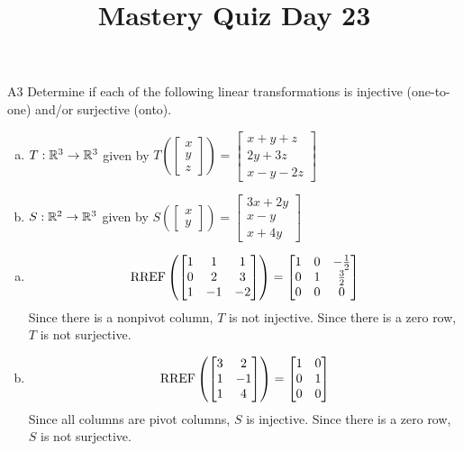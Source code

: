 \documentclass{sbgLAquiz}
\title{Mastery Quiz Day 23 }
\begin{document}
\begin{problem}{A3}
Determine if each of the following linear transformations is injective (one-to-one) and/or surjective (onto).
\begin{enumerate}[(a)]
\item $T: \mathbb{R}^3 \rightarrow \mathbb{R}^3$ given by $T\left(\begin{bmatrix} x \\ y \\ z  \end{bmatrix} \right) = \begin{bmatrix} x+y+z \\ 2y+3z \\ x-y-2z \end{bmatrix} $
\item $S: \mathbb{R}^2 \rightarrow \mathbb{R}^3$ given by $S\left(\begin{bmatrix} x \\ y  \end{bmatrix} \right) = \begin{bmatrix} 3x+2y \\ x-y \\ x+4y \end{bmatrix} $
\end{enumerate}
\end{problem}
\begin{solution}
\begin{enumerate}[(a)]
\item $$\operatorname{RREF}\left( \begin{bmatrix} 1 &  1 & 1 \\ 0  & 2 & 3 \\ 1  & -1 & -2 \end{bmatrix} \right) = \begin{bmatrix} 1 &  0 & -\frac{1}{2} \\ 0  & 1 & \frac{3}{2} \\ 0& 0 & 0  \end{bmatrix}$$
Since there is a nonpivot column, $T$ is not injective.  Since there is a zero row, $T$ is not surjective.
\item $$\operatorname{RREF} \left( \begin{bmatrix} 3 & 2 \\ 1 & -1 \\ 1 & 4 \end{bmatrix} \right) = \begin{bmatrix} 1 & 0 \\ 0 & 1 \\ 0 & 0 \end{bmatrix}$$
Since all columns are pivot columns, $S$ is injective.  Since there is a zero row, $S$ is not surjective.
\end{enumerate}
\end{solution}
\end{document}
